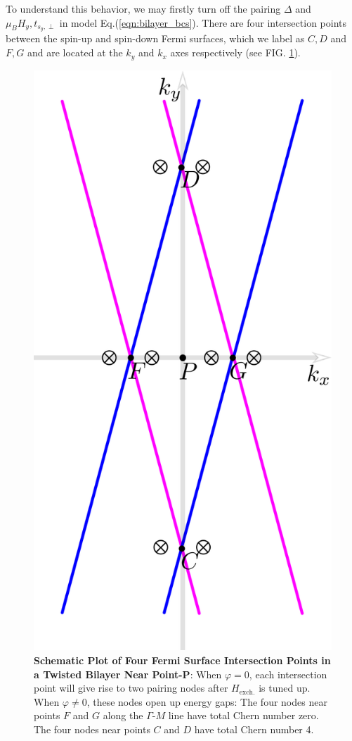 To understand this behavior, we may firstly turn off the pairing $\Delta$ and $\mu_B H_y, t_{s_y,\perp}$  in model Eq.(\ref{eqn:bilayer_bcs}). There are four intersection points between the spin-up and spin-down Fermi surfaces, which we label as $C,D$ and $F,G$ and are located at the $k_y$ and $k_x$ axes respectively (see FIG. \ref{fig: all eight nodes}).
\begin{figure}[!htp]
	\centering
	\includegraphics[scale=0.4]{contents/Ising_Top/figures/pdf_files/eight_nodes.pdf}
	\caption{{\bf Schematic Plot of Four Fermi Surface Intersection Points in a Twisted Bilayer Near Point-P}: When $\varphi=0$, each intersection point will give rise to two pairing nodes after $H_{\text{exch.}}$ is tuned up. When $\varphi\neq 0$, these nodes open up energy gaps: The four nodes near points $F$ and $G$ along the $\Gamma$-$M$ line have total Chern number zero. The four nodes near points $C$ and $D$ have total Chern number 4.}
	\label{fig: all eight nodes}
\end{figure}
